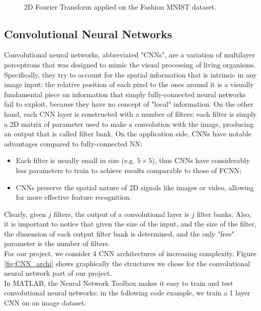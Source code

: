 \documentclass[letterpaper,12pt]{article}
\begin{document}
\begin{figure}[!ht]
\begin{subfigure}{.35\textwidth}
  \caption{~}
\end{subfigure}
\caption{2D Fourier Transform applied on the Fashion MNIST dataset.}
\label{fig:2dft}
\end{figure}

\subsection*{Convolutional Neural Networks}

Convolutional neural networks, abbreviated "CNNs", are a variation of multilayer perceptrons that was designed to mimic the visual processing of living organisms. Specifically, they try to account for the spatial information that is intrinsic in any image input: the relative position of each pixel to the ones around it is a visually fundamental piece on information that simply fully-connected neural networks fail to exploit, because they have no concept of "local" information. On the other hand, each CNN layer is constructed with a number of filters: each filter is simply a 2D matrix of parameter used to make a convolution with the image, producing an output that is called filter bank. On the application side, CNNs have notable advantages compared to fully-connected NN:
\begin{itemize}
		\item Each filter is usually small in size (e.g. $5\times5$), thus CNNs have considerably less parameters to train to achieve results comparable to those of FCNN;
		\item CNNs preserve the spatial nature of 2D signals like images or video, allowing for more effective feature recognition. 
\end{itemize} 
Clearly, given $j$ filters, the output of a convolutional layer is $j$ filter banks. Also, it is important to notice that given the size of the input, and the size of the filter, the dimension of each output filter bank is determined, and the only "free" parameter is the number of filters.\\
For our project, we consider 4 CNN architectures of increasing complexity. Figure \ref{fig:CNN_archi} shows graphically the structures we chose for the convolutional neural network part of our project. \\

In MATLAB, the Neural Network Toolbox makes it easy to train and test convolutional neural networks: in the following code example, we train a 1 layer CNN on an image dataset.\\
\end{document}

